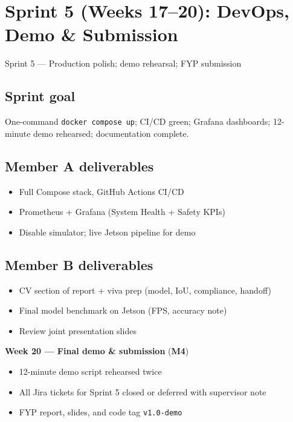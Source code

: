 \documentclass[12pt,a4paper]{article}
\begin{document}
\section{Sprint 5 (Weeks 17--20): DevOps, Demo \& Submission}

\begin{sprintbox}{{Sprint 5 --- Production polish; demo rehearsal; FYP submission}}

\subsection*{Sprint goal}
One-command \texttt{docker compose up}; CI/CD green; Grafana dashboards; 12-minute demo rehearsed; documentation complete.

\subsection*{Member A deliverables}
\begin{itemize}
    \item Full Compose stack, GitHub Actions CI/CD
    \item Prometheus + Grafana (System Health + Safety KPIs)
    \item Disable simulator; live Jetson pipeline for demo
\end{itemize}

\subsection*{Member B deliverables}
\begin{itemize}
    \item CV section of report + viva prep (model, IoU, compliance, handoff)
    \item Final model benchmark on Jetson (FPS, accuracy note)
    \item Review joint presentation slides
\end{itemize}

\begin{collabbox}
\textbf{Week 20 --- Final demo \& submission} (\textbf{M4})
\begin{itemize}
    \item 12-minute demo script rehearsed twice
    \item All Jira tickets for Sprint 5 closed or deferred with supervisor note
    \item FYP report, slides, and code tag \texttt{v1.0-demo}
\end{itemize}
\end{collabbox}

\end{sprintbox}
\end{document}
